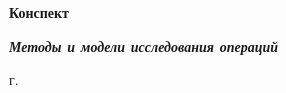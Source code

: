 \begin{titlepage}
\begin{center}

\vspace{35mm}

\textbf{\large Конспект}

\textbf{\textit{\large Методы и модели исследования операций}}

\vspace{20mm}

\vfill

{\the\year{} г.}
\end{center}
\end{titlepage}

\restoregeometry
\addtocounter{page}{1}
